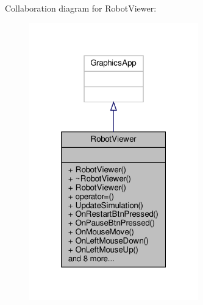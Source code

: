 Collaboration diagram for Robot\+Viewer\+:\nopagebreak
\begin{figure}[H]
\begin{center}
\leavevmode
\includegraphics[width=208pt]{classRobotViewer__coll__graph}
\end{center}
\end{figure}
